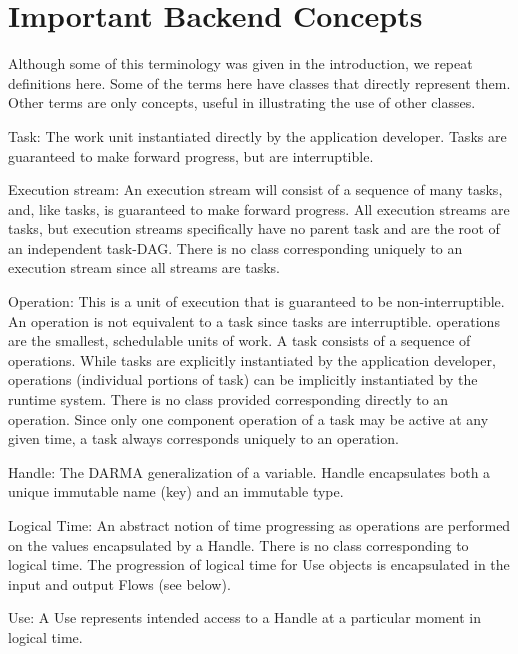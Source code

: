 \section{Important Backend Concepts}
Although some of this terminology was given in the introduction, we repeat definitions here.
Some of the terms here have \CC{} classes that directly represent them.
Other terms are only concepts, useful in illustrating the use of other \CC{} classes.
\begin{compactdesc}
\item [Task:] The work unit instantiated directly by the application developer. 
Tasks are guaranteed to make forward progress, but are interruptible.
\item [Execution stream:] An \gls{execution stream} will consist of a sequence of
  many \glspl{task}, and, like \glspl{task}, is guaranteed to make forward progress.
  All \glspl{execution stream} are \glspl{task}, but \glspl{execution stream} specifically
  have no parent \gls{task} and are the root of an independent \gls{task-DAG}.
  There is no class corresponding uniquely to an \gls{execution stream} since all
streams are \glspl{task}.
\item [Operation:] This is a unit of execution that is guaranteed to be non-interruptible. 
  An \gls{operation} is not equivalent to a \gls{task} since \glspl{task} are interruptible.  
  \Glspl{operation} are the smallest, schedulable units of work.  
A \gls{task} consists of a sequence of \glspl{operation}.
While \glspl{task} are explicitly instantiated by the application developer,
\glspl{operation}
(individual portions of \gls{task}) can be implicitly instantiated by the
\gls{runtime system}.
There is no class provided corresponding directly to an \gls{operation}.
Since only one component \gls{operation} of a \gls{task} may be active at any given
time, a \gls{task} always corresponds uniquely to an \gls{operation}.
\item [Handle:] The \gls{DARMA} generalization of a variable. Handle encapsulates both a unique immutable name (key) and an immutable type. 
\item [Logical Time:] An abstract notion of time progressing as
  \glspl{operation} are performed on the values encapsulated by a Handle.
There is no class corresponding to logical time. 
The progression of logical time for Use objects is encapsulated in the input and output Flows (see below).
\item [Use:] A Use represents intended access to a Handle at a particular moment in logical time. 

\end{compactdesc}
